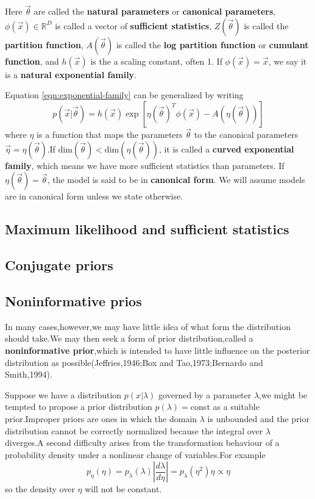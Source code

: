 Here $\vec{\theta}$ are called the \textbf{natural parameters} or \textbf{canonical parameters}, $\phi(\vec{x}) \in \mathbb{R}^D$ is called a vector of \textbf{sufficient statistics}, $Z(\vec{\theta})$ is called the \textbf{partition function}, $A(\vec{\theta})$ is called the \textbf{log partition function} or \textbf{cumulant function}, and $h(\vec{x})$ is the a scaling constant, often 1. If $\phi(\vec{x})=\vec{x}$, we say it is a \textbf{natural exponential family}.

Equation \ref{eqn:exponential-family} can be generalized by writing
\begin{equation}
p(\vec{x}|\vec{\theta}) = h(\vec{x})\exp[\eta(\vec{\theta})^T\phi(\vec{x})-A(\eta(\vec{\theta}))]
\end{equation}
where $\eta$ is a function that maps the parameters $\vec{\theta}$ to the canonical parameters $\vec{\eta}=\eta(\vec{\theta})$.If $\mathrm{dim}(\vec{\theta})<\mathrm{dim}(\eta(\vec{\theta}))$, it is called a \textbf{curved exponential family}, which means we have more sufficient statistics than parameters. If $\eta(\vec{\theta})=\vec{\theta}$, the model is said to be in \textbf{canonical form}. We will assume models are in canonical form unless we state otherwise.

\subsection{Maximum likelihood and sufficient statistics}

\subsection{Conjugate priors}

\subsection{Noninformative prios}
In many cases,however,we may have little idea of what form the distribution should take.We may then seek a form of prior distribution,called a \textbf{noninformative prior},which is intended to have little influence on the posterior distribution as possible(Jeffries,1946;Box and Tao,1973;Bernardo and Smith,1994).

Suppose we have a distribution $p(x|\lambda)$ governed by a parameter $\lambda$,we might be tempted to propose a prior distribution $p(\lambda) = $const as a suitable prior.Improper priors are ones in which the domain $\lambda$ is unbounded and the prior distribution cannot be correctly normalized because the integral over $\lambda$ diverges.A second difficulty arises from the transformation behaviour of a probability density under a nonlinear change of variables.For example
\begin{equation}
p_\eta(\eta) = p_\lambda(\lambda) \left | \dfrac{d\lambda}{d\eta} \right | = p_\lambda(\eta^2)\eta\propto \eta
\end{equation}
so the density over $\eta$ will not be constant.

